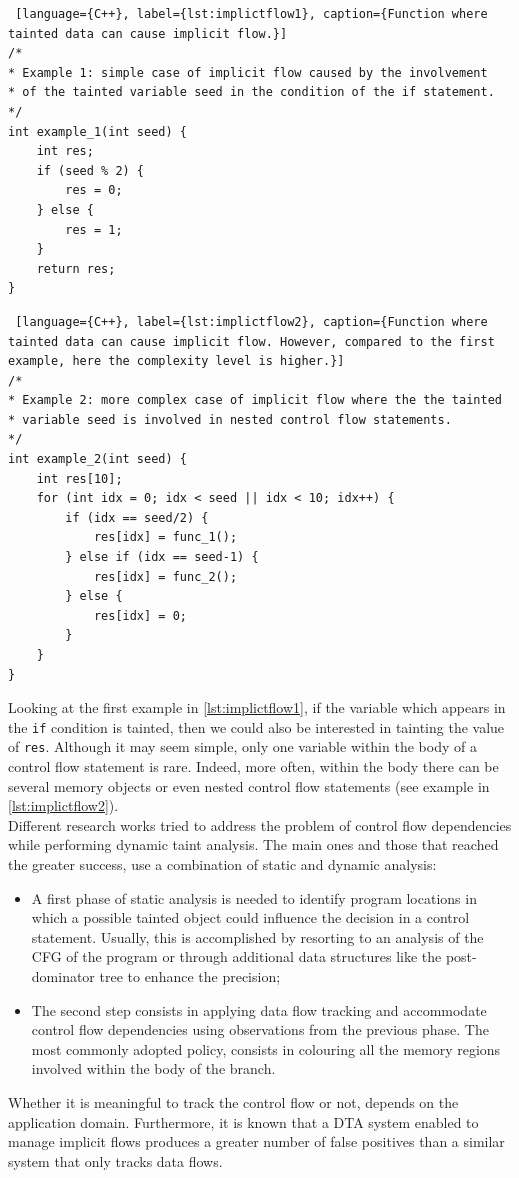 \documentclass[LaM,binding=0.6cm]{sapthesis}
\begin{document}
\begin{lstlisting} [language={C++}, label={lst:implictflow1}, caption={Function where tainted data can cause implicit flow.}]
/*
* Example 1: simple case of implicit flow caused by the involvement
* of the tainted variable seed in the condition of the if statement.
*/
int example_1(int seed) {
	int res;
	if (seed % 2) {
		res = 0;
	} else {
		res = 1;
	}
	return res;
}
\end{lstlisting}
\begin{lstlisting} [language={C++}, label={lst:implictflow2}, caption={Function where tainted data can cause implicit flow. However, compared to the first example, here the complexity level is higher.}]
/*
* Example 2: more complex case of implicit flow where the the tainted
* variable seed is involved in nested control flow statements.
*/
int example_2(int seed) {
	int res[10];
	for (int idx = 0; idx < seed || idx < 10; idx++) {
		if (idx == seed/2) {
			res[idx] = func_1();
		} else if (idx == seed-1) {
			res[idx] = func_2();
		} else {
			res[idx] = 0;
		}	
	}
}
\end{lstlisting}

Looking at the first example in \ref{lst:implictflow1}, if the variable which appears in the \texttt{if} condition is tainted, then we could also be interested in tainting the value of \texttt{res}. Although it may seem simple, only one variable within the body of a control flow statement is rare. Indeed, more often, within the body there can be several memory objects or even nested control flow statements (see example in \ref{lst:implictflow2}).\\
Different research works\cite{graa2012detecting}\cite{clause2007dytan}\cite{chen2011dynamic} tried to address the problem of control flow dependencies while performing dynamic taint analysis. The main ones and those that reached the greater success, use a combination of static and dynamic analysis:
\begin{itemize}
\item A first phase of static analysis is needed to identify program locations in which a possible tainted object could influence the decision in a control statement. Usually, this is accomplished by resorting to an analysis of the CFG of the program or through additional data structures like the post-dominator tree to enhance the precision;
\item The second step consists in applying data flow tracking and accommodate control flow dependencies using observations from the previous phase. The most commonly adopted policy, consists in colouring all the memory regions involved within the body of the branch.
\end{itemize}
Whether it is meaningful to track the control flow or not, depends on the application domain. Furthermore, it is known that a DTA system enabled to manage implicit flows produces a greater number of false positives than a similar system that only tracks data flows.\\
\end{document}
